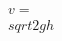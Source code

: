 \documentclass[preview]{standalone}
\begin{document}
\begin{align*}
v = \\sqrt{2gh}
\end{align*}
\end{document}
